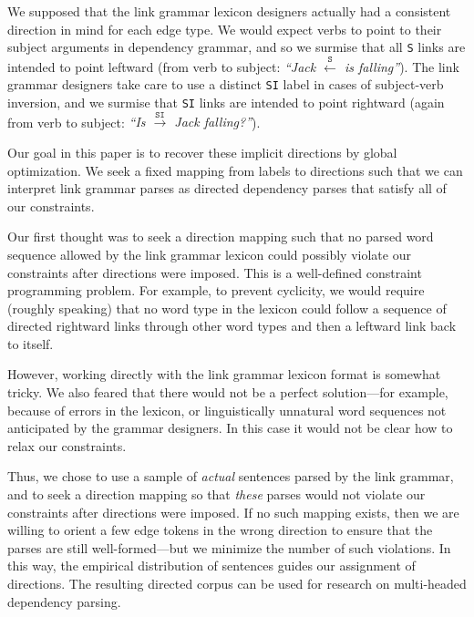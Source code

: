 \documentclass[11pt]{article}
\begin{document}
We supposed that the link grammar lexicon designers actually had a consistent direction in mind for each edge type.  We would expect verbs to point to their subject arguments in dependency grammar, and so we surmise that all \texttt{S} links are intended to point leftward (from verb to subject: {\em ``Jack $\stackrel{\texttt{S}}{\leftarrow}$ is falling''}).  The link grammar designers take care to use a distinct \texttt{SI} label in cases of subject-verb inversion, and we surmise that \texttt{SI} links are intended to point rightward (again from verb to subject: {\em ``Is $\stackrel{\texttt{SI}}{\rightarrow}$ Jack falling?''}).

Our goal in this paper is to recover these implicit directions by global optimization.  We seek a fixed mapping from labels to directions such that we can interpret link grammar parses as directed dependency parses that satisfy all of our constraints.

Our first thought was to seek a direction mapping such that no parsed word sequence allowed by the link grammar lexicon could possibly violate our constraints after directions were imposed.  This is a well-defined constraint programming problem.  For example, to prevent cyclicity, we would require (roughly speaking) that no word type in the lexicon could follow a sequence of directed rightward links through other word types and then a leftward link back to itself.  

However, working directly with the link grammar lexicon format is somewhat tricky.  We also feared that there would not be a perfect solution---for example, because of errors in the lexicon, or linguistically unnatural word sequences not anticipated by the grammar designers.  In this case it would not be clear how to relax our constraints.

Thus, we chose to use a sample of {\em actual} sentences parsed by the link grammar, and to seek a direction mapping so that {\em these} parses would not violate our constraints after directions were imposed.  If no such mapping exists, then we are willing to orient a few edge tokens in the wrong direction to ensure that the parses are still well-formed---but we minimize the number of such violations.  In this way, the empirical distribution of sentences guides our assignment of directions.  The resulting directed corpus can be used for research on multi-headed dependency parsing.

\end{document}
